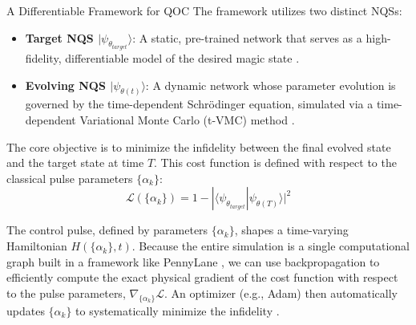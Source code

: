 \documentclass[final]{beamer}
\newlength{\colwidth}
\begin{document}
\begin{frame}[t]
\begin{columns}[t]
\begin{column}{\colwidth}
\begin{alertblock}{A Differentiable Framework for QOC}
    The framework utilizes two distinct NQSs:
    \begin{itemize}
        \item \textbf{Target NQS $|\psi_{\theta_{target}}\rangle$}: A static, pre-trained network that serves as a high-fidelity, differentiable model of the desired magic state \cite{Berni2025Proposal}.
        \vspace{12px}
        \item \textbf{Evolving NQS $|\psi_{\theta(t)}\rangle$}: A dynamic network whose parameter evolution is governed by the time-dependent Schrödinger equation, simulated via a time-dependent Variational Monte Carlo (t-VMC) method \cite{Carleo2012}.
    \end{itemize}
    
    The core objective is to minimize the infidelity between the final evolved state and the target state at time $T$. This cost function is defined with respect to the classical pulse parameters $\{\alpha_{k}\}$:
    $$ \mathcal{L}(\{\alpha_{k}\}) = 1 - |\langle\psi_{\theta_{target}}|\psi_{\theta(T)}\rangle|^{2} $$
    
    The control pulse, defined by parameters $\{\alpha_{k}\}$, shapes a time-varying Hamiltonian $H(\{\alpha_{k}\}, t)$. Because the entire simulation is a single computational graph built in a framework like PennyLane \cite{Bergholm2018}, we can use backpropagation to efficiently compute the exact physical gradient of the cost function with respect to the pulse parameters, $\nabla_{\{\alpha_{k}\}}\mathcal{L}$. An optimizer (e.g., Adam) then automatically updates $\{\alpha_{k}\}$ to systematically minimize the infidelity \cite{Berni2025Proposal}.
    

\end{alertblock}
\end{column}
\end{columns}
\end{frame}
\end{document}
